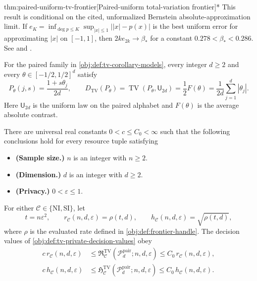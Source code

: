 \begin{theoremv}{thm:paired-uniform-tv-frontier}[Paired-uniform total-variation frontier]*
This result is conditional on the cited, unformalized Bernstein absolute-approximation limit. If \(e_K=\inf_{\deg p\le K}\sup_{|x|\le1}\lvert |x|-p(x)\rvert\) is the best uniform error for approximating \(|x|\) on \([-1,1]\), then \(2k e_{2k}\to\beta_*\) for a constant \(0.278<\beta_*<0.286\). See \citet[Section 3.1]{CaiLow2011Nonsmooth} and \citet{Bernstein1913}.

For the paired family in \cref{obj:def:tv-corollary-models}, every integer \(d\ge2\) and every \(\theta\in[-1/2,1/2]^d\) satisfy
\[
 P_\theta(j,s)=\frac{1+s\theta_j}{2d},
 \qquad
 D_{\mathrm{TV}}(P_\theta)
 =\operatorname{TV}(P_\theta,\mathsf U_{2d})
 =\frac12F(\theta)
 =\frac{1}{2d}\sum_{j=1}^{d}|\theta_j|.
\]
Here \(\mathsf U_{2d}\) is the uniform law on the paired alphabet and \(F(\theta)\) is the average absolute contrast.

There are universal real constants \(0<c\le C_0<\infty\) such that the following conclusions hold for every resource tuple satisfying
\begin{itemize}
\item \textbf{(Sample size.)} \(n\) is an integer with \(n\ge2\).
\item \textbf{(Dimension.)} \(d\) is an integer with \(d\ge2\).
\item \textbf{(Privacy.)} \(0<\varepsilon\le1\).
\end{itemize}
For either \(\mathcal C\in\{\mathrm{NI},\mathrm{SI}\}\), let
\[
 t=n\varepsilon^2,\qquad
 r_{\mathcal C}(n,d,\varepsilon)=\rho(t,d),\qquad
 h_{\mathcal C}(n,d,\varepsilon)=\sqrt{\rho(t,d)},
\]
where \(\rho\) is the evaluated rate defined in \cref{obj:def:frontier-handle}. The decision values of \cref{obj:def:tv-private-decision-values} obey
\[
\begin{aligned}
 c\,r_{\mathcal C}(n,d,\varepsilon)
 &\le
 \mathfrak R^{\mathrm{TV}}_{\mathcal C}
   (\mathcal P_d^{\mathrm{pair}};n,d,\varepsilon)
 \le C_0\,r_{\mathcal C}(n,d,\varepsilon),\\
 c\,h_{\mathcal C}(n,d,\varepsilon)
 &\le
 \mathfrak H^{\mathrm{TV}}_{\mathcal C}
   (\mathcal P_d^{\mathrm{pair}};n,d,\varepsilon)
 \le C_0\,h_{\mathcal C}(n,d,\varepsilon).
\end{aligned}
\]


\end{theoremv}
